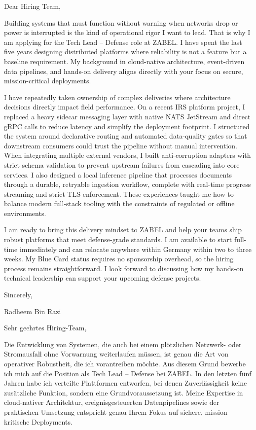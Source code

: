 \documentclass[11pt,a4paper]{coverletter}
\begin{document}

\opening{Dear Hiring Team,}

Building systems that must function without warning when networks drop or power is interrupted is the kind of operational rigor I want to lead. That is why I am applying for the Tech Lead – Defense role at ZABEL. I have spent the last five years designing distributed platforms where reliability is not a feature but a baseline requirement. My background in cloud-native architecture, event-driven data pipelines, and hands-on delivery aligns directly with your focus on secure, mission-critical deployments.

I have repeatedly taken ownership of complex deliveries where architecture decisions directly impact field performance. On a recent IRS platform project, I replaced a heavy sidecar messaging layer with native NATS JetStream and direct gRPC calls to reduce latency and simplify the deployment footprint. I structured the system around declarative routing and automated data-quality gates so that downstream consumers could trust the pipeline without manual intervention. When integrating multiple external vendors, I built anti-corruption adapters with strict schema validation to prevent upstream failures from cascading into core services. I also designed a local inference pipeline that processes documents through a durable, retryable ingestion workflow, complete with real-time progress streaming and strict TLS enforcement. These experiences taught me how to balance modern full-stack tooling with the constraints of regulated or offline environments.

I am ready to bring this delivery mindset to ZABEL and help your teams ship robust platforms that meet defense-grade standards. I am available to start full-time immediately and can relocate anywhere within Germany within two to three weeks. My Blue Card status requires no sponsorship overhead, so the hiring process remains straightforward. I look forward to discussing how my hands-on technical leadership can support your upcoming defense projects.

\closing{Sincerely,}{Radheem Bin Razi}

\clearpage
{}


\opening{Sehr geehrtes Hiring-Team,}

Die Entwicklung von Systemen, die auch bei einem plötzlichen Netzwerk- oder Stromausfall ohne Vorwarnung weiterlaufen müssen, ist genau die Art von operativer Robustheit, die ich vorantreiben möchte. Aus diesem Grund bewerbe ich mich auf die Position als Tech Lead – Defense bei ZABEL. In den letzten fünf Jahren habe ich verteilte Plattformen entworfen, bei denen Zuverlässigkeit keine zusätzliche Funktion, sondern eine Grundvoraussetzung ist. Meine Expertise in cloud-nativer Architektur, ereignisgesteuerten Datenpipelines sowie der praktischen Umsetzung entspricht genau Ihrem Fokus auf sichere, mission-kritische Deployments.
\end{document}
